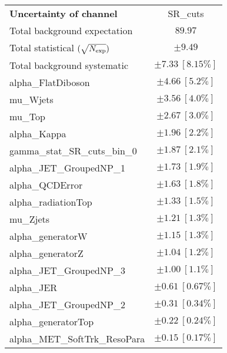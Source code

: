 
\begin{table}
\begin{center}
\setlength{\tabcolsep}{0.0pc}
\begin{tabular*}{\textwidth}{@{\extracolsep{\fill}}lc}
\noalign{\smallskip}\hline\noalign{\smallskip}
{\bf Uncertainty of channel}                                    & SR\_cuts            \\
\noalign{\smallskip}\hline\noalign{\smallskip}
Total background expectation             &  $89.97$       \\
\noalign{\smallskip}\hline\noalign{\smallskip}
Total statistical $(\sqrt{N_{\rm exp}})$              & $\pm 9.49$       \\
Total background systematic               & $\pm 7.33\ [8.15\%] $             \\
\noalign{\smallskip}\hline\noalign{\smallskip}
\noalign{\smallskip}\hline\noalign{\smallskip}
alpha\_FlatDiboson         & $\pm 4.66\ [5.2\%] $       \\
mu\_Wjets         & $\pm 3.56\ [4.0\%] $       \\
mu\_Top         & $\pm 2.67\ [3.0\%] $       \\
alpha\_Kappa         & $\pm 1.96\ [2.2\%] $       \\
gamma\_stat\_SR\_cuts\_bin\_0         & $\pm 1.87\ [2.1\%] $       \\
alpha\_JET\_GroupedNP\_1         & $\pm 1.73\ [1.9\%] $       \\
alpha\_QCDError         & $\pm 1.63\ [1.8\%] $       \\
alpha\_radiationTop         & $\pm 1.33\ [1.5\%] $       \\
mu\_Zjets         & $\pm 1.21\ [1.3\%] $       \\
alpha\_generatorW         & $\pm 1.15\ [1.3\%] $       \\
alpha\_generatorZ         & $\pm 1.04\ [1.2\%] $       \\
alpha\_JET\_GroupedNP\_3         & $\pm 1.00\ [1.1\%] $       \\
alpha\_JER         & $\pm 0.61\ [0.67\%] $       \\
alpha\_JET\_GroupedNP\_2         & $\pm 0.31\ [0.34\%] $       \\
alpha\_generatorTop         & $\pm 0.22\ [0.24\%] $       \\
alpha\_MET\_SoftTrk\_ResoPara         & $\pm 0.15\ [0.17\%] $       \\

\end{tabular*}
\end{center}
\end{table}
